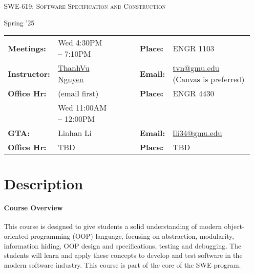 \documentclass[11pt]{article}
\begin{document}
\begin{center}
{\Large \textsc{SWE-619: Software Specification and Construction}}

\vspace{0.1in}
{\large Spring '25}
\end{center}

\begin{minipage}[t]{.75\textwidth}
    \centering
\begin{tabular}{llcccll}
  \toprule
  \textbf{Meetings:} & Wed 4:30PM -- 7:10PM  & & & & \textbf{Place:} & ENGR 1103\\
\textbf{Instructor:} & \href{https://go.gmu.edu/tvn}{ThanhVu Nguyen} & & &  & \textbf{Email:} &  \href{mailto:tvn@gmu.edu}{tvn@gmu.edu} (Canvas is preferred)\\
\textbf{Office Hr:} & (email first)& & & & \textbf{Place:} & ENGR 4430\\
&Wed 11:00AM -- 12:00PM &&&&&\\
  \hline
\textbf{GTA:} & Linhan Li & & &  & \textbf{Email:} &  \href{mailto:lli34@gmu.edu}{lli34@gmu.edu}\\
\textbf{Office Hr:} & TBD & & & & \textbf{Place:} & TBD \\
\bottomrule
\end{tabular}
\end{minipage}
 

\section{Description}

\paragraph{Course Overview}
This course is designed to give students a solid understanding of modern object-oriented programming (OOP) language, focusing on abstraction, modularity, information hiding, OOP design and specifications, testing and debugging. The students will learn and apply these concepts to develop and test software in the modern software industry.  This course is part of the core of the SWE program.
\end{document}
